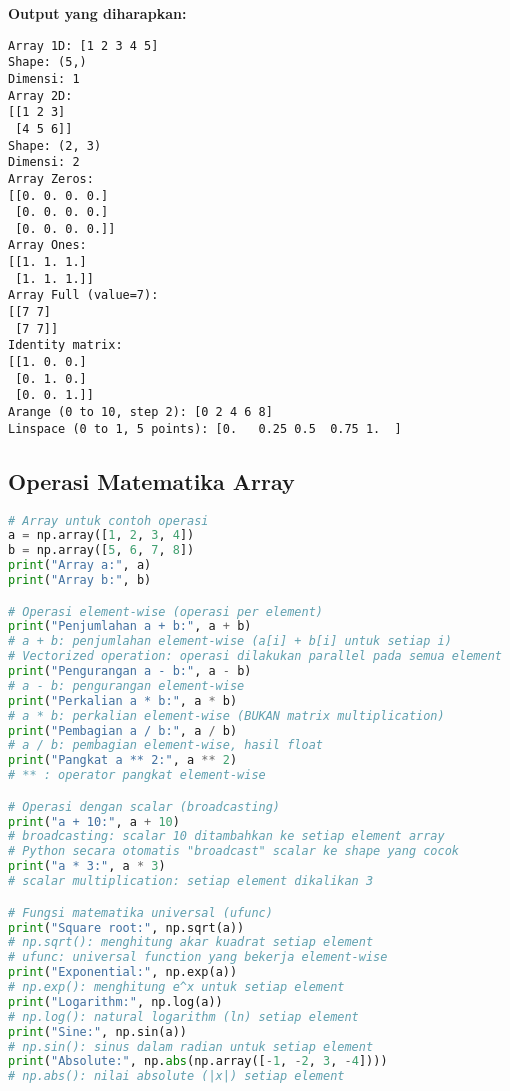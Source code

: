 \textbf{Output yang diharapkan:}
\begin{lstlisting}[style=bash]
Array 1D: [1 2 3 4 5]
Shape: (5,)
Dimensi: 1
Array 2D:
[[1 2 3]
 [4 5 6]]
Shape: (2, 3)
Dimensi: 2
Array Zeros:
[[0. 0. 0. 0.]
 [0. 0. 0. 0.]
 [0. 0. 0. 0.]]
Array Ones:
[[1. 1. 1.]
 [1. 1. 1.]]
Array Full (value=7):
[[7 7]
 [7 7]]
Identity matrix:
[[1. 0. 0.]
 [0. 1. 0.]
 [0. 0. 1.]]
Arange (0 to 10, step 2): [0 2 4 6 8]
Linspace (0 to 1, 5 points): [0.   0.25 0.5  0.75 1.  ]
\end{lstlisting}

\subsection*{Operasi Matematika Array}

\begin{lstlisting}[language=python, caption={Operasi Element-wise dan Broadcasting}, style=python]
# Array untuk contoh operasi
a = np.array([1, 2, 3, 4])
b = np.array([5, 6, 7, 8])
print("Array a:", a)
print("Array b:", b)

# Operasi element-wise (operasi per element)
print("Penjumlahan a + b:", a + b)
# a + b: penjumlahan element-wise (a[i] + b[i] untuk setiap i)
# Vectorized operation: operasi dilakukan parallel pada semua element
print("Pengurangan a - b:", a - b)
# a - b: pengurangan element-wise
print("Perkalian a * b:", a * b)
# a * b: perkalian element-wise (BUKAN matrix multiplication)
print("Pembagian a / b:", a / b)
# a / b: pembagian element-wise, hasil float
print("Pangkat a ** 2:", a ** 2)
# ** : operator pangkat element-wise

# Operasi dengan scalar (broadcasting)
print("a + 10:", a + 10)
# broadcasting: scalar 10 ditambahkan ke setiap element array
# Python secara otomatis "broadcast" scalar ke shape yang cocok
print("a * 3:", a * 3)
# scalar multiplication: setiap element dikalikan 3

# Fungsi matematika universal (ufunc)
print("Square root:", np.sqrt(a))
# np.sqrt(): menghitung akar kuadrat setiap element
# ufunc: universal function yang bekerja element-wise
print("Exponential:", np.exp(a))
# np.exp(): menghitung e^x untuk setiap element
print("Logarithm:", np.log(a))
# np.log(): natural logarithm (ln) setiap element
print("Sine:", np.sin(a))
# np.sin(): sinus dalam radian untuk setiap element
print("Absolute:", np.abs(np.array([-1, -2, 3, -4])))
# np.abs(): nilai absolute (|x|) setiap element
\end{lstlisting}


